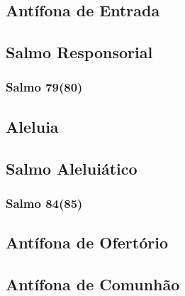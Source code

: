 \subsection{Antífona de Entrada}\label{subsection:tempus-adventus/missa-1/introitus}

\subsection[Salmo Responsorial]{Salmo Responsorial}\label{subsection:tempus-adventus/missa-1/psalmus-responsorius}
\subsubsection{Salmo 79(80)}

\AllowPageFlush

\subsection{Aleluia}\label{subsection:tempus-adventus/missa-1/alleluia}

\AllowPageFlush

\subsection[Salmo Aleluiático]{Salmo Aleluiático}\label{subsection:tempus-adventus/missa-1/psalmus-alleluiaticus}
\subsubsection{Salmo 84(85)}

\AllowPageFlush

\subsection{Antífona de Ofertório}\label{subsection:tempus-adventus/missa-1/offertorium}

\AllowPageFlush

\subsection{Antífona de Comunhão}\label{subsection:tempus-adventus/missa-1/communio}

\AllowPageFlush